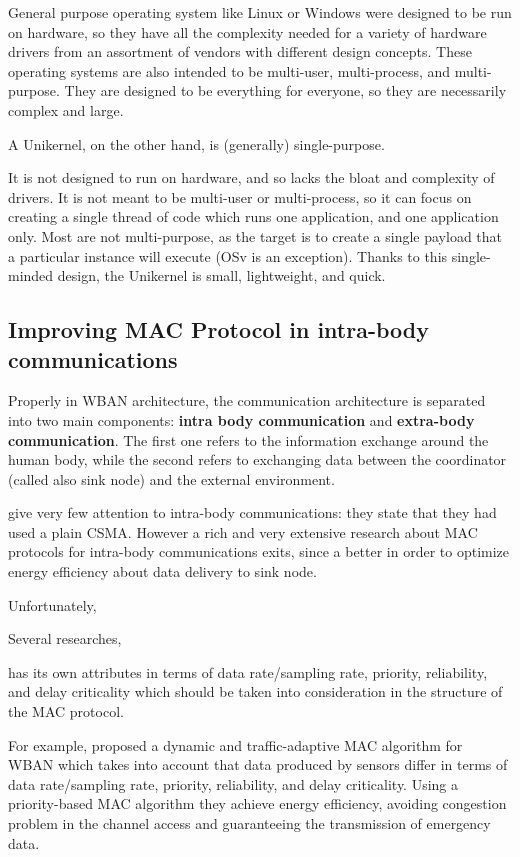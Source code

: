 \documentclass[sigchi]{acmart}
\begin{document}
General purpose operating system like Linux or Windows were designed to be run on hardware, so they have all the complexity needed for a variety of hardware drivers from an assortment of vendors with different design concepts. These operating systems are also intended to be multi-user, multi-process, and multi-purpose. They are designed to be everything for everyone, so they are necessarily complex and large.

A Unikernel, on the other hand, is (generally) single-purpose. 


It is not designed to run on hardware, and so lacks the bloat and complexity of drivers. It is not meant to be multi-user or multi-process, so it can focus on creating a single thread of code which runs one application, and one application only. Most are not multi-purpose, as the target is to create a single payload that a particular instance will execute (OSv is an exception). Thanks to this single-minded design, the Unikernel is small, lightweight, and quick. 

\subsection{Improving MAC Protocol in intra-body communications}

Properly in WBAN architecture, the communication architecture is separated into two main components: \textbf{intra body communication} and \textbf{extra-body communication}. The first one refers to the information exchange around the human body, while the second refers to exchanging data between the coordinator (called also sink node) and the external environment.

\citet{MSAReport} give very few attention to intra-body communications: they state that they had used a plain CSMA. However a rich and very extensive research about MAC protocols for intra-body communications exits, since a better  in order to optimize energy efficiency about data delivery to sink node.

Unfortunately, 

Several researches, 



has its own  attributes in terms of data rate/sampling rate, priority, reliability, and delay criticality which should be taken into consideration in the structure of the MAC protocol.

For example, \citet{ImprovedMAC} proposed a dynamic and traffic-adaptive MAC algorithm for WBAN which takes into account that data produced by sensors differ in terms of data rate/sampling rate, priority, reliability, and delay criticality. Using a priority-based MAC algorithm they achieve energy efficiency, avoiding congestion problem in the 
channel access and guaranteeing the transmission of emergency data. 



















\appendix
\end{document}
